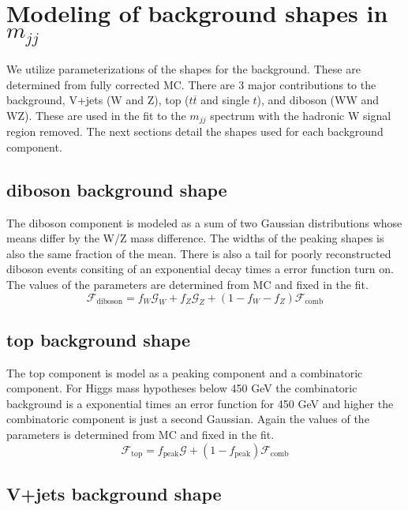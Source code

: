 \section{Modeling of background shapes in \texorpdfstring{$m_{jj}$}{dijet invariant mass} }
\label{sec:modelShape}

We utilize parameterizations of the shapes for the background.  These
are determined from fully corrected MC.  There are 3 major
contributions to the background, V+jets (W and Z), top
($t\overline{t}$ and single $t$), and diboson (WW and WZ).  These are
used in the fit to the $m_{jj}$ spectrum with the hadronic W signal
region removed.  The next sections detail the shapes used for each
background component.

\subsection{diboson background shape}
\label{sec:dibosonShape}

The diboson component is modeled as a sum of two Gaussian
distributions whose means differ by the W/Z mass difference.  The
widths of the peaking shapes is also the same fraction of the mean.
There is also a tail for poorly reconstructed diboson events consiting
of an exponential decay times a error function turn on.  The values of
the parameters are determined from MC and fixed in the fit.
\begin{equation}
\mathcal{F}_\text{diboson} = f_W\mathcal{G}_W + f_Z\mathcal{G}_Z + (1-f_W-f_Z)\mathcal{F}_\text{comb}
\end{equation}

\subsection{top background shape}
\label{sec:topShape}

The top component is model as a peaking component and a combinatoric
component.  For Higgs mass hypotheses below 450 GeV the combinatoric
background is a exponential times an error function for 450 GeV and
higher the combinatoric component is just a second Gaussian.  Again
the values of the parameters is determined from MC and fixed in the
fit.
\begin{equation}
\mathcal{F}_\text{top} = f_\text{peak}\mathcal{G} +
(1-f_\text{peak})\mathcal{F}_\text{comb}
\end{equation}

\subsection{V+jets background shape}
\label{sec:wjetsShape}
 
